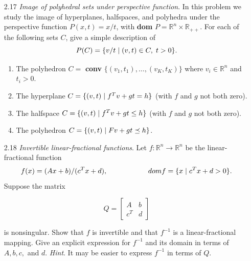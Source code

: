 \documentclass[12pt, oneside]{article}%
\def\R{{\mathbb R}}
\begin{document}
\begin{enumerate}[font=\bfseries]
\vspace{5cm}

\item [2.17] \textit{Image of polyhedral sets under perspective function}. In this problem we study the image of hyperplanes, halfspaces, and polyhedra under the perspective function $P(x, t) = x/t$, with \textbf{dom} $P = \R^n \times \R_{++}$. For each of the following sets $C$, give a simple description of
$$P(C) = \{v/t \hspace{0.1cm} | \hspace{0.1cm} (v, t) \in C, \hspace{0.1cm} t > 0\}.$$
\begin{enumerate}
    \item The polyhedron $C =$ \textbf{conv} $\{(v_1, t_1), \dots , (v_K, t_K)\}$ where $v_i \in \R^n$ and $t_i > 0$.
    \item The hyperplane $C = \{(v, t)\hspace{0.1cm} |\hspace{0.1cm} f^T v + gt = h\}$ (with $f$ and $g$ not both zero).
    \item The halfspace $C = \{(v, t) \hspace{0.1cm} | \hspace{0.1cm} f^T v + gt \leq h\}$ (with $f$ and $g$ not both zero).
    \item The polyhedron $C = \{(v, t) \hspace{0.1cm}|\hspace{0.1cm} Fv + gt \preceq h\}$.
\end{enumerate}

\vspace{5cm}

\item [2.18] \textit{Invertible linear-fractional functions}. Let $f : \R^n \rightarrow \R^n$ be the linear-fractional function
$$f(x) = (Ax + b)/(c^T x + d), \hspace{2cm}domf = \{x \hspace{0.1cm}| \hspace{0.1cm} c^T x + d > 0\}.$$
Suppose the matrix

$$ Q =  \begin{bmatrix}
A & b \\
c^T & d
\end{bmatrix} $$

is nonsingular. Show that $f$ is invertible and that $f^{-1}$ is a linear-fractional mapping. Give an explicit expression for $f^{-1}$ and its domain in terms of $A, b, c,$ and $d$. \textit{Hint}. It may be easier to express $f^{-1}$ in terms of $Q$. 

\vspace{10cm}



\end{enumerate}
\end{document}
